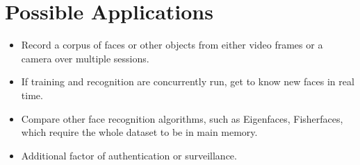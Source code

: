 \documentclass{article}
\begin{document}
\section{Possible Applications}
\begin{itemize}
    \item{Record a corpus of faces or other objects from either video frames or a camera over multiple sessions.}
    \item{If training and recognition are concurrently run, get to know new faces in real time.}
    \item{Compare other face recognition algorithms, such as Eigenfaces, Fisherfaces, which require the whole dataset to be in main memory.}
    \item{Additional factor of authentication or surveillance.}
\end{itemize}


\printbibliography
\end{document}
